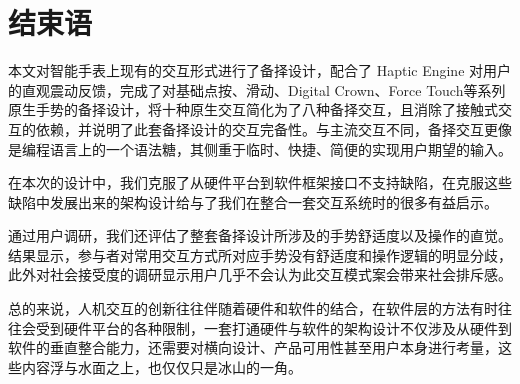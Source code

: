 \section{结束语}

本文对智能手表上现有的交互形式进行了备择设计，配合了 Haptic Engine 对用户的直观震动反馈，完成了对基础点按、滑动、Digital Crown、Force Touch等系列原生手势的备择设计，将十种原生交互简化为了八种备择交互，且消除了接触式交互的依赖，并说明了此套备择设计的交互完备性。与主流交互不同，备择交互更像是编程语言上的一个语法糖，其侧重于临时、快捷、简便的实现用户期望的输入。

在本次的设计中，我们克服了从硬件平台到软件框架接口不支持缺陷，在克服这些缺陷中发展出来的架构设计给与了我们在整合一套交互系统时的很多有益启示。

通过用户调研，我们还评估了整套备择设计所涉及的手势舒适度以及操作的直觉。结果显示，参与者对常用交互方式所对应手势没有舒适度和操作逻辑的明显分歧，此外对社会接受度的调研显示用户几乎不会认为此交互模式案会带来社会排斥感。

总的来说，人机交互的创新往往伴随着硬件和软件的结合，在软件层的方法有时往往会受到硬件平台的各种限制，一套打通硬件与软件的架构设计不仅涉及从硬件到软件的垂直整合能力，还需要对横向设计、产品可用性甚至用户本身进行考量，这些内容浮与水面之上，也仅仅只是冰山的一角。

\cleardoublepage
